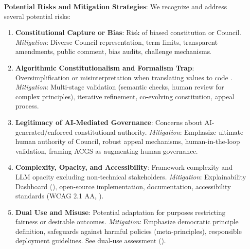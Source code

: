 \documentclass[manuscript,screen,review,anonymous,9pt]{acmart}
\begin{document}
\textbf{Potential Risks and Mitigation Strategies}:
We recognize and address several potential risks:
\begin{enumerate}[leftmargin=*,itemsep=1pt,parsep=1pt]
    \item \textbf{Constitutional Capture or Bias}: Risk of biased constitution or Council.
        \textit{Mitigation}: Diverse Council representation, term limits, transparent amendments, public comment, bias audits, challenge mechanisms.
    \item \textbf{Algorithmic Constitutionalism and Formalism Trap}: Oversimplification or misinterpretation when translating values to code \cite{Selbst2019FairnessAccountability}.
        \textit{Mitigation}: Multi-stage validation (semantic checks, human review for complex principles), iterative refinement, co-evolving constitution, appeal process.
    \item \textbf{Legitimacy of AI-Mediated Governance}: Concerns about AI-generated/enforced constitutional authority.
        \textit{Mitigation}: \sloppy Emphasize ultimate human authority of Council, robust appeal mechanisms, human-in-the-loop validation, framing ACGS as augmenting human governance. \fussy
    \item \textbf{Complexity, Opacity, and Accessibility}: Framework complexity and LLM opacity excluding non-technical stakeholders.
        \textit{Mitigation}: Explainability Dashboard (), open-source implementation, documentation, accessibility standards (WCAG 2.1 AA, ).
    \item \textbf{Dual Use and Misuse}: Potential adaptation for purposes restricting fairness or desirable outcomes.
        \textit{Mitigation}: \sloppy Emphasize democratic principle definition, safeguards against harmful policies (meta-principles), responsible deployment guidelines. See dual-use assessment (). \fussy
\end{enumerate}
\end{document}
